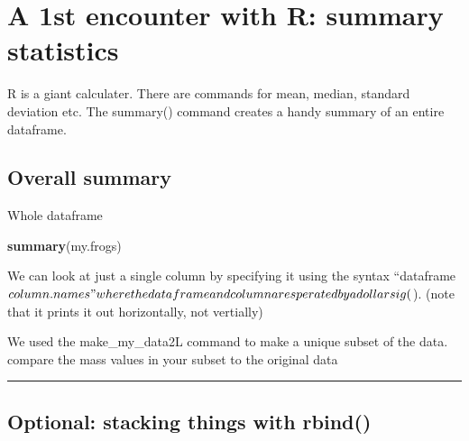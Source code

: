 \documentclass[]{book}
\newenvironment{Shaded}{\begin{snugshade}}{\end{snugshade}}
\newcommand{\KeywordTok}[1]{\textcolor[rgb]{0.13,0.29,0.53}{\textbf{#1}}}
\newcommand{\OperatorTok}[1]{\textcolor[rgb]{0.81,0.36,0.00}{\textbf{#1}}}
\newcommand{\NormalTok}[1]{#1}
\theoremstyle{definition}
\theoremstyle{definition}
\theoremstyle{definition}
\theoremstyle{remark}
\begin{document}
\section{A 1st encounter with R: summary
statistics}\label{a-1st-encounter-with-r-summary-statistics}

R is a giant calculater. There are commands for mean, median, standard
deviation etc. The summary() command creates a handy summary of an
entire dataframe.

\subsection{Overall summary}\label{overall-summary}

Whole dataframe

\begin{Shaded}
\begin{Highlighting}[]
\KeywordTok{summary}\NormalTok{(my.frogs)}
\end{Highlighting}
\end{Shaded}

We can look at just a single column by specifying it using the syntax
``dataframe\(column.names" where the dataframe and column are sperated by a dollar sig (\)).
(note that it prints it out horizontally, not vertially)

\begin{Shaded}
\end{Shaded}

We used the make\_my\_data2L command to make a unique subset of the
data. compare the mass values in your subset to the original data

\begin{Shaded}
\end{Shaded}

\begin{center}\rule{0.5\linewidth}{\linethickness}\end{center}

\subsection{Optional: stacking things with
rbind()}\label{optional-stacking-things-with-rbind}
\end{document}

